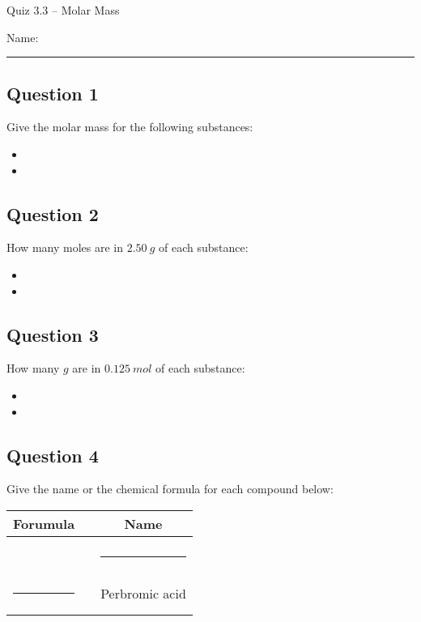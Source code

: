 \documentclass[11pt, letterpaper]{memoir}
\begin{document}
	\begin{center}
		{\large	Quiz 3.3 --  Molar Mass}
	\end{center}
{\large Name: \rule[-1mm]{4in}{.1pt}
	
	\subsection*{Question 1}
	Give the molar mass for the following substances:
	\begin{itemize}
		\item \vspace{0.5em} 
		\item \vspace{0.75em} 
	\end{itemize}
	
	\vspace{0.5em}
	\subsection*{Question 2}
	How many moles are in $2.50~g$ of each substance:
	\begin{itemize}
		\item \vspace{0.5em} 
		\item \vspace{0.75em} 
	\end{itemize}
	
	
	\vspace{0.5em}
	\subsection*{Question 3}
	How many $g$ are in $0.125~mol$ of each substance:
	\begin{itemize}
		\item \vspace{0.5em} 
		\item \vspace{0.75em} 
	\end{itemize}

	\vspace{0.5em}
	\subsection*{Question 4}
Give the name or the chemical formula for each compound below:

\begin{tabular}{ccc}
	Forumula && Name \\ \midrule \\
	\ch{H2SO3} && \rule[-1mm]{2in}{.1pt} \\ \\	
	\rule[-1mm]{1in}{.1pt} && Perbromic acid \\ \\
\end{tabular}	
\newpage
\pagestyle{empty}
\addtocounter{page}{-1}
}
\end{document}
